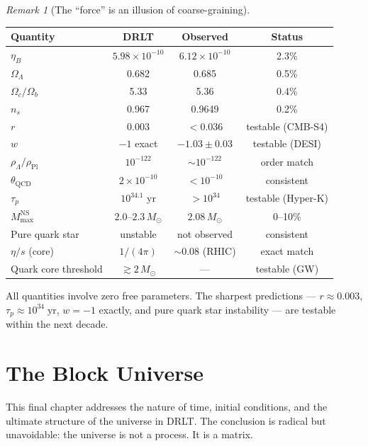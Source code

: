\documentclass[12pt]{article}
\theoremstyle{remark}
\newtheorem{remark}[theorem]{Remark}
\theoremstyle{definition}
\begin{document}
\begin{remark}[The ``force'' is an illusion of coarse-graining]
\begin{center}
\begin{tabular}{lccc}
\hline
Quantity & DRLT & Observed & Status \\
\hline
$\eta_B$ & $5.98 \times 10^{-10}$ & $6.12 \times 10^{-10}$ & 2.3\% \\
$\Omega_\Lambda$ & 0.682 & 0.685 & 0.5\% \\
$\Omega_c/\Omega_b$ & 5.33 & 5.36 & 0.4\% \\
$n_s$ & 0.967 & 0.9649 & 0.2\% \\
$r$ & 0.003 & $< 0.036$ & testable (CMB-S4) \\
$w$ & $-1$ exact & $-1.03 \pm 0.03$ & testable (DESI) \\
$\rho_\Lambda/\rho_\text{Pl}$ & $10^{-122}$ & $\sim 10^{-122}$ & order match \\
$\theta_\text{QCD}$ & $2 \times 10^{-10}$ & $< 10^{-10}$ & consistent \\
$\tau_p$ & $10^{34.1}$ yr & $> 10^{34}$ & testable (Hyper-K) \\
$M_\text{max}^\text{NS}$ & $2.0$--$2.3\,M_\odot$ & $2.08\,M_\odot$ & 0--10\% \\
Pure quark star & unstable & not observed & consistent \\
$\eta/s$ (core) & $1/(4\pi)$ & $\sim 0.08$ (RHIC) & exact match \\
Quark core threshold & $\gtrsim 2\,M_\odot$ & --- & testable (GW) \\
\hline
\end{tabular}
\end{center}

All quantities involve zero free parameters. The sharpest predictions --- $r \approx 0.003$, $\tau_p \approx 10^{34}\;\text{yr}$, $w = -1$ exactly, and pure quark star instability --- are testable within the next decade.



\section{The Block Universe}
\label{ch:block}

This final chapter addresses the nature of time, initial conditions, and the ultimate structure of the universe in DRLT. The conclusion is radical but unavoidable: the universe is not a process. It is a matrix.


\end{remark}
\end{document}
